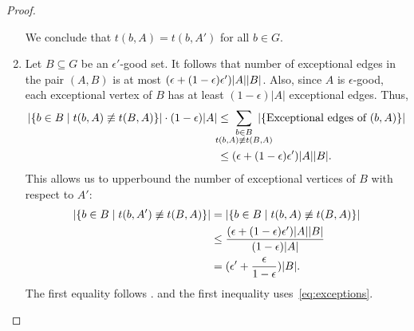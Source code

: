 \begin{lemma}
\begin{proof}
\begin{enumerate}[label={\Roman*}., ref={\Roman*}, font=\rmfamily]
                We conclude that $t(b,A) = t(b,A')$ for all $b \in G$.
                \item
                    Let $B \subseteq G$ be an $\epsilon'$-good set.
                    It follows  that number of exceptional edges
                    in the pair $(A,B)$ is at most \mbox{$( \epsilon + ( 1 - \epsilon ) \epsilon' )| A || B |$}.
                    Also, since  $A$ is $\epsilon$-good, each exceptional vertex of $B$ has at least $(1-\epsilon)|A|$ exceptional edges.
                    Thus,
                    \begin{align} \nonumber
                        \parstraight{\parcurly{b \in B \mid t(b, A) \not\equiv t(B,A)}} \cdot \parround{1 - \epsilon}\parstraight{A}
                            & \leq \hspace{-1.5em}\sum_{\substack{b \in B \\ t(b, A) \not\equiv t(B,A)}}\hspace{-1.5em}
                                \parstraight{\parcurly{\text{Exceptional edges of }(b,A)}} \\
                            & \leq \parround{\epsilon + \parround{1 - \epsilon} \epsilon'}\parstraight{A}\parstraight{B}. \label{eq:exceptions}
                    \end{align}
                    This allows us to upperbound the number of exceptional vertices of $B$ with respect to $A'$:
                    \begin{align}
                        | \{ b \in B \mid t(b, A') \not\equiv t(B,A) \} |
                            & = | \{ b \in B \mid t(b, A) \not\equiv t(B,A) \} | \nonumber \\
                            & \leq \frac{( \epsilon + ( 1 - \epsilon ) \epsilon' )| A || B |}
                                {( 1 - \epsilon )| A |} \nonumber \\
                            & = ( \epsilon' + \frac{\epsilon}{1 - \epsilon} )| B |. \label{eq:exceptional_edges_BAi}
                    \end{align}
                    The first equality follows .
                    and the first inequality uses~\eqref{eq:exceptions}.


\end{enumerate}
\end{proof}
\end{lemma}
